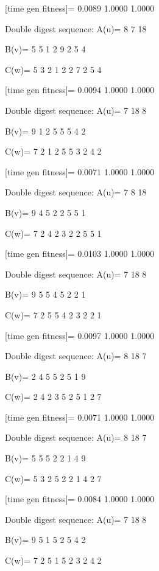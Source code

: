 [time gen fitness]=
    0.0089    1.0000    1.0000

Double digest sequence:
A(u)=
     8     7    18

B(v)=
     5     5     1     2     9     2     5     4

C(w)=
     5     3     2     1     2     2     7     2     5     4

[time gen fitness]=
    0.0094    1.0000    1.0000

Double digest sequence:
A(u)=
     7    18     8

B(v)=
     9     1     2     5     5     5     4     2

C(w)=
     7     2     1     2     5     5     3     2     4     2

[time gen fitness]=
    0.0071    1.0000    1.0000

Double digest sequence:
A(u)=
     7     8    18

B(v)=
     9     4     5     2     2     5     5     1

C(w)=
     7     2     4     2     3     2     2     5     5     1

[time gen fitness]=
    0.0103    1.0000    1.0000

Double digest sequence:
A(u)=
     7    18     8

B(v)=
     9     5     5     4     5     2     2     1

C(w)=
     7     2     5     5     4     2     3     2     2     1

[time gen fitness]=
    0.0097    1.0000    1.0000

Double digest sequence:
A(u)=
     8    18     7

B(v)=
     2     4     5     5     2     5     1     9

C(w)=
     2     4     2     3     5     2     5     1     2     7

[time gen fitness]=
    0.0071    1.0000    1.0000

Double digest sequence:
A(u)=
     8    18     7

B(v)=
     5     5     5     2     2     1     4     9

C(w)=
     5     3     2     5     2     2     1     4     2     7

[time gen fitness]=
    0.0084    1.0000    1.0000

Double digest sequence:
A(u)=
     7    18     8

B(v)=
     9     5     1     5     2     5     4     2

C(w)=
     7     2     5     1     5     2     3     2     4     2

